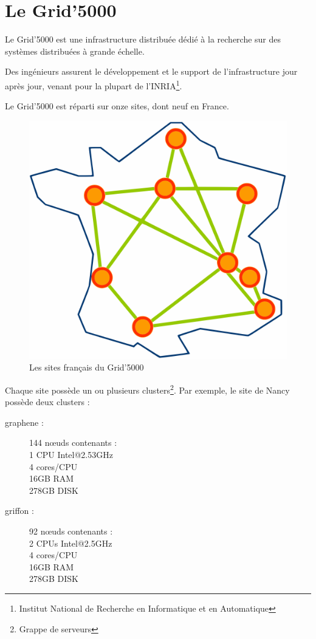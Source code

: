 \documentclass[12pt]{report}
\begin{document}
                        \newpage
		\section{Le Grid'5000}
		\label{defgrid}
		Le Grid'5000 est une infrastructure distribuée dédié à la recherche sur des systèmes distribuées à grande échelle.

		Des ingénieurs assurent le développement et le support de l'infrastructure jour après jour, venant pour la plupart	de l'INRIA\footnote{Institut National de Recherche en Informatique et en Automatique}.

		Le Grid'5000 est réparti sur onze sites, dont neuf en France.

		\begin{figure}[H]
			\begin{center}
				\includegraphics[width=0.4\linewidth]{images/Site_map.png}
				\caption{Les sites français du Grid'5000}
			\end{center}
		\end{figure}

		Chaque site possède un ou plusieurs clusters\footnote{Grappe de serveurs}. Par exemple, le site de Nancy possède deux clusters :
		
		\begin{description}
			\item[graphene :] 144 nœuds contenants :\\
			1 CPU Intel@2.53GHz\\
			4 cores/CPU\\
			16GB RAM\\
			278GB DISK
			\item[griffon :] 92 nœuds contenants :\\
			2 CPUs Intel@2.5GHz\\
			4 cores/CPU\\
			16GB RAM\\
			278GB DISK
		\end{description}
                \newpage
                
\end{document}
